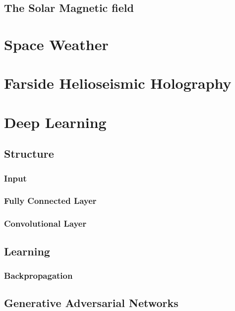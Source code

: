 \documentclass[11pt,a4paper,onecolumn]{report}
\begin{document}
%
\subsection{The Solar Magnetic field}
%
\label{sec:solar magnetic field}


%
%
\section{Space Weather}
%
%



%
%
\section{Farside Helioseismic Holography}
%
%




%
%
\section{Deep Learning}
%
%

%
\subsection{Structure}
%

\subsubsection*{Input}

\subsubsection*{Fully Connected Layer}

\subsubsection*{Convolutional Layer}



%
\subsection{Learning}
%

\subsubsection*{Backpropagation}


%
\subsection{Generative Adversarial Networks}
%
\end{document}
